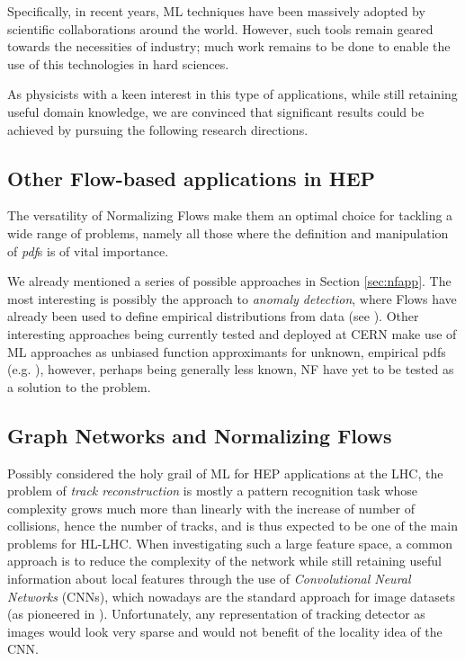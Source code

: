 Specifically, in recent years, ML techniques have been massively adopted by scientific collaborations around the world. However, such tools remain geared towards the necessities of industry; much work remains to be done to enable the use of this technologies in hard sciences.

As physicists with a keen interest in this type of applications, while still retaining useful domain knowledge, we are convinced that significant results could be achieved by pursuing the following research directions. 

\subsection{Other Flow-based applications in HEP}

The versatility of Normalizing Flows make them an optimal choice for tackling a wide range of problems, namely all those where the definition and manipulation of \emph{pdf}s is of vital importance.

We already mentioned a series of possible approaches in Section \ref{sec:nfapp}. The most interesting is possibly the approach to \emph{anomaly detection}, where Flows have already been used to define empirical distributions from data (see \cite{Kasieczka_2021}). Other interesting approaches being currently tested and deployed at CERN make use of ML approaches as unbiased function approximants for unknown, empirical pdfs (e.g. \cite{D_Agnolo_2019}), however, perhaps being generally less known, NF have yet to be tested as a solution to the problem.

\subsection{Graph Networks and Normalizing Flows}

Possibly considered the holy grail of ML for HEP applications at the LHC, the problem of \emph{track reconstruction} is mostly a pattern recognition task whose complexity grows much more than linearly with the increase of number of collisions, hence the number of tracks, and is thus expected to be one of the main problems for HL-LHC. When investigating such a large feature space, a common approach is to reduce the complexity of the network while still retaining useful information about local features through the use of \emph{Convolutional Neural Networks} (CNNs), which nowadays are the standard approach for image datasets (as pioneered in \cite{simonyan2015deep}).
Unfortunately, any representation of tracking detector as images
would look very sparse and would not benefit of the locality idea of the CNN. 

